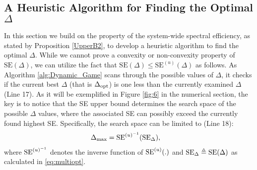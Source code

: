 \documentclass[conference, a4paper, 10pt]{IEEEtran}
\begin{document}
\subsection{A Heuristic Algorithm for Finding the Optimal $\Delta$}
In this section we build on the property of the system-wide spectral efficiency, as stated by Proposition \ref{UpperB2}, to develop a heuristic algorithm to find the optimal $\Delta$. While we cannot prove a convexity or non-convexity property of $\text{SE}(\Delta)$, we can utilize the fact that
$\text{SE}(\Delta) \leq \text{SE}^{(u)}(\Delta)$ as follows.
As Algorithm \ref{alg:Dynamic_Game}
 scans through the possible values of $\Delta$, it checks if the current best $\Delta$ (that is $\Delta_{\textup{opt}}$) is one less than the currently examined $\Delta$ (Line 17).
As it will be exemplified in Figure \ref{fig:6} in the numerical section, the key is to notice that the SE upper bound
determines the search space of the possible $\Delta$ values, where the associated SE can possibly exceed the currently found highest SE. Specifically, the search space can be limited to (Line 18):
\begin{align}
\Delta_{\textup{max}} &= \textup{SE}^{{(u)}^{-1}}(\textup{SE} _{\textup{$\Delta$}}),
\end{align}
where $\textup{SE}^{{(u)}^{-1}}$ denotes the inverse function of $\textup{SE}^{(u)}(.)$ and
$\textup{SE}_\Delta \triangleq \textup{SE}(\Delta)$ as calculated in \eqref{eq:multiopt}.
\end{document}
